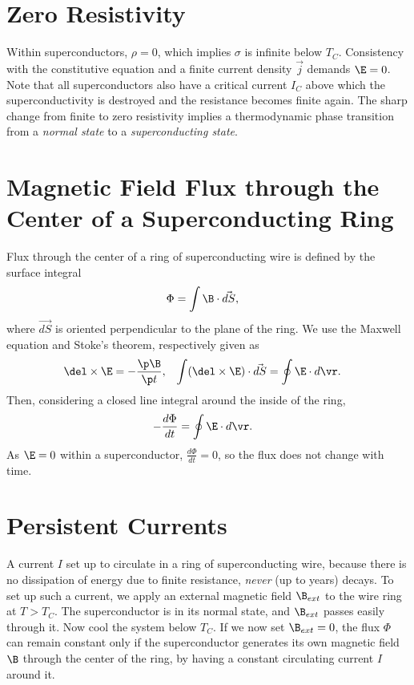 \documentclass[a4paper, 11pt, normalem]{report}
\begin{document}
\section{Zero Resistivity}
Within superconductors, $\rho=0$, which implies $\sigma$ is infinite below $T_C$.
Consistency with the constitutive equation and a finite current density $\vec{j}$ demands $\E=0$.
Note that all superconductors also have a critical current $I_C$ above which the superconductivity is destroyed and the resistance becomes finite again.
The sharp change from finite to zero resistivity implies a thermodynamic phase transition from a \emph{normal state} to a \emph{superconducting state}.

\section{Magnetic Field Flux through the Center of a Superconducting Ring}
Flux through the center of a ring of superconducting wire is defined by the surface integral
\begin{align}
    \Phi &= \int \B\cdot \vec{dS},
\end{align}
where $\vec{dS}$ is oriented perpendicular to the plane of the ring.
We use the Maxwell equation and Stoke's theorem, respectively given as
\begin{align}
    \del\times\E &= -\frac{\p\B}{\p t}, & \int(\del\times\E)\cdot\vec{dS} &= \oint \E\cdot d\vr.
\end{align}
Then, considering a closed line integral around the inside of the ring,
\begin{align}
    -\frac{d\Phi}{dt} &= \oint \E\cdot d\vr.
\end{align}
As $\E=0$ within a superconductor, $\frac{d\Phi}{dt}=0$, so the flux does not change with time.

\section{Persistent Currents}
A current $I$ set up to circulate in a ring of superconducting wire, because there is no dissipation of energy due to finite resistance, \emph{never} (up to years) decays.
To set up such a current, we apply an external magnetic field $\B_{ext}$ to the wire ring at $T>T_C$.
The superconductor is in its normal state, and $\B_{ext}$ passes easily through it.
Now cool the system below $T_C$.
If we now set $\B_{ext}=0$, the flux $\Phi$ can remain constant only if the superconductor generates its own magnetic field $\B$ through the center of the ring, by having a constant circulating current $I$ around it.
\end{document}
